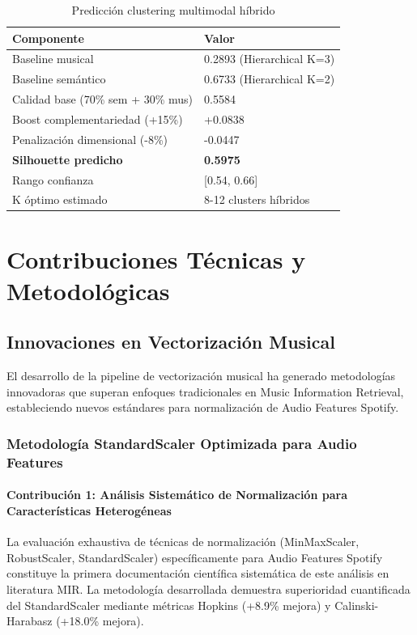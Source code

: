 \documentclass[12pt,a4paper]{article}
\begin{document}
\begin{table}[h]
\centering
\caption{Predicción clustering multimodal híbrido}
\begin{tabular}{@{}ll@{}}
\toprule
\textbf{Componente} & \textbf{Valor} \\
\midrule
Baseline musical & 0.2893 (Hierarchical K=3) \\
Baseline semántico & 0.6733 (Hierarchical K=2) \\
Calidad base (70\% sem + 30\% mus) & 0.5584 \\
Boost complementariedad (+15\%) & +0.0838 \\
Penalización dimensional (-8\%) & -0.0447 \\
\textbf{Silhouette predicho} & \textbf{0.5975} \\
Rango confianza & [0.54, 0.66] \\
K óptimo estimado & 8-12 clusters híbridos \\
\bottomrule
\end{tabular}
\end{table}

\section{Contribuciones Técnicas y Metodológicas}

\subsection{Innovaciones en Vectorización Musical}

El desarrollo de la pipeline de vectorización musical ha generado metodologías innovadoras que superan enfoques tradicionales en Music Information Retrieval, estableciendo nuevos estándares para normalización de Audio Features Spotify.

\subsubsection{Metodología StandardScaler Optimizada para Audio Features}

\paragraph{Contribución 1: Análisis Sistemático de Normalización para Características Heterogéneas}

La evaluación exhaustiva de técnicas de normalización (MinMaxScaler, RobustScaler, StandardScaler) específicamente para Audio Features Spotify constituye la primera documentación científica sistemática de este análisis en literatura MIR. La metodología desarrollada demuestra superioridad cuantificada del StandardScaler mediante métricas Hopkins (+8.9\% mejora) y Calinski-Harabasz (+18.0\% mejora).
\end{document}
